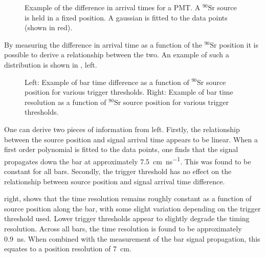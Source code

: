 \begin{figure}[h]
  \begin{adjustbox}{max totalsize={.8\textwidth}, center}
    
  \end{adjustbox}
  \caption[Example of difference in signal arrival times for a PMT]{Example of the difference in arrival times for a PMT. A $^{90}\text{Sr}$ source is held in a fixed position. A gaussian is fitted to the data points (shown in red).}
  \label{fig:deltaTEx}
\end{figure}

By measuring the difference in arrival time as a function of the $^{90}\text{Sr}$ position it is possible to derive a relationship between the two.
An example of such a distribution is shown in , left.

\begin{figure}[h]
  \begin{minipage}[t]{.5\textwidth}
    \begin{adjustbox}{max totalsize={\textwidth}, center}
      
    \end{adjustbox}
  \end{minipage}
  \hfill
  \begin{minipage}[t]{.5\textwidth}
    \begin{adjustbox}{max totalsize={\textwidth}, center}
      
    \end{adjustbox}
  \end{minipage}
  \caption[Examples of bar time difference and time resolution as a function of source position]{Left: Example of bar time difference as a function of $^{90}\text{Sr}$ source position for various trigger thresholds. Right: Example of bar time resolution as a function of $^{90}\text{Sr}$ source position for various trigger thresholds. }
  \label{fig:barTimeDiffRes}
\end{figure}


One can derive two pieces of information from  left.
Firstly, the relationship between the source position and signal arrival time appears to be linear.
When a first order polynomial is fitted to the data points, one finds that the signal propagates down the bar at approximately \SI{7.5}{\cm\per\nano\second}.
This was found to be constant for all bars.
Secondly, the trigger threshold has no effect on the relationship between source position and signal arrival time difference.

 right, shows that the time resolution remains roughly constant as a function of source position along the bar, with some slight variation depending on the trigger threshold used.
Lower trigger thresholds appear to slightly degrade the timing resolution.
Across all bars, the time resolution is found to be approximately \SI{0.9}{\nano\second}.
When combined with the measurement of the bar signal propagation, this equates to a position resolution of \SI{7}{\cm}.
